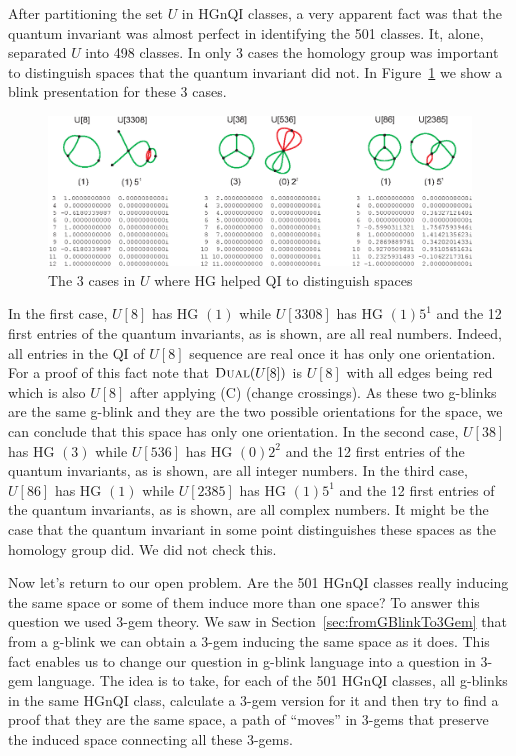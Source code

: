 After partitioning the set $U$ in HGnQI classes, a very apparent
fact was that the quantum invariant was almost perfect in
identifying the 501 classes. It, alone, separated $U$ into 498
classes. In only 3 cases the homology group was important to
distinguish spaces that the quantum invariant did not. In
Figure~\ref{fig:qiFailure} we show a blink presentation for
these 3 cases.
\begin{figure}[htp]
   \begin{center}
      \leavevmode
      \includegraphics[width=15cm]{fig/qiFailure.eps}
   \end{center}
   \vspace{-0.7cm}
   \caption{ The 3 cases in $U$ where HG helped QI to distinguish spaces}
   \label{fig:qiFailure}
\end{figure}
In the first case, $U[8]$ has HG $(1)$
while $U[3308]$ has HG $(1) 5^1$ and the 12 first
entries of the quantum invariants, as is shown,
are all real numbers. Indeed, all entries in the QI of $U[8]$
sequence are real once it has only one orientation.
For a proof of this fact note that
$\textsc{Dual}(U[8])$ is $U[8]$ with
all edges being red which is also $U[8]$ after applying (C)
(change crossings). As these two g-blinks are the same
g-blink and they are the two possible orientations
for the space, we can conclude that this space has only
one orientation. In the second case, $U[38]$ has HG $(3)$
while $U[536]$ has HG $(0) 2^2$ and the 12 first
entries of the quantum invariants, as is shown,
are all integer numbers. In the third case, $U[86]$ has HG $(1)$
while $U[2385]$ has HG $(1) 5^1$ and the 12 first
entries of the quantum invariants, as is shown,
are all complex numbers. It might be the case that
the quantum invariant in some point distinguishes these
spaces as the homology group did. We did not check this.

Now let's return to our open problem. Are the 501 HGnQI
classes really inducing the same space or some of them
induce more than one space? To answer this question we
used 3-gem theory. We saw in Section~\ref{sec:fromGBlinkTo3Gem}
that from a g-blink we can obtain a 3-gem inducing the
same space as it does. This fact enables us to change
our question in g-blink language into a question in 3-gem language. The
idea is to take, for each of the 501 HGnQI classes, all g-blinks
in the same HGnQI class, calculate a 3-gem version for it
and then try to find a proof that they are the same space, \ie
a path of ``moves'' in 3-gems that preserve the induced space
connecting all these 3-gems.

